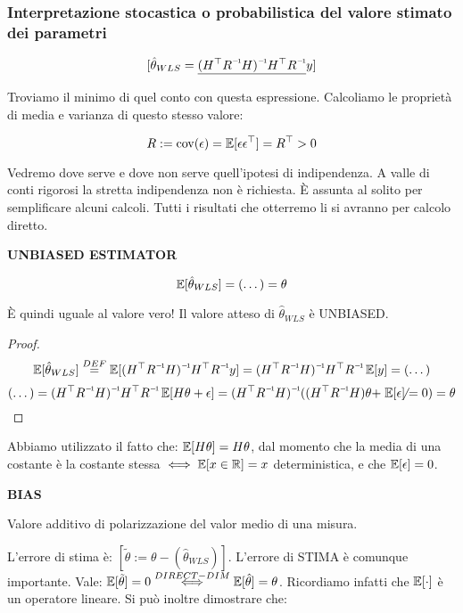 \subsubsection{Interpretazione stocastica o probabilistica del valore stimato dei parametri}

\[
	[\hat{\theta}_{WLS} = \underline{\inv{(H^\top\inv{R}H)}H^\top\inv{R}}y]
\]

Troviamo il minimo di quel conto con questa espressione. Calcoliamo le proprietà di media e varianza di questo stesso valore:

\[
	R := \operatorname{cov}(\epsilon) = \operatorname{\mathbb{E}}[\epsilon\epsilon^\top] = R^\top > 0
\]

Vedremo dove serve e dove non serve quell'ipotesi di indipendenza. A valle di conti rigorosi la stretta indipendenza non è richiesta. \`E assunta al solito per semplificare alcuni calcoli. Tutti i risultati che otterremo li si avranno per calcolo diretto.

\begin{thrm}{\textbf{UNBIASED ESTIMATOR}}

\[
	\operatorname{\mathbb{E}}[\hat{\theta}_{WLS}] = (\dots) = \theta
\]

\end{thrm}

\`E quindi uguale al valore vero! Il valore atteso di $\hat{\theta}_{WLS}$ è UNBIASED. 

\begin{proof}

\[
	\E[\hat{\theta}_{WLS}] \stackrel{DEF}{=} \E[\inv{(H^\top\inv{R}H)}H^\top\inv{R}y] = \inv{(H^\top\inv{R}H)}H^\top\inv{R}\E[y] = (\dots)
\]
\[
	(\dots) = \inv{(H^\top\inv{R}H)}H^\top\inv{R}\E[H\theta+\epsilon] = \inv{(H^\top\inv{R}H)}((H^\top\inv{R}H)\theta+\centernot{\E[\epsilon]=0}) = \theta
\]

\end{proof}

Abbiamo utilizzato il fatto che: $\operatorname{\mathbb{E}}[H\theta]=H\theta$, dal momento che la media di una costante è la costante stessa $\iff\operatorname{\mathbb{E}}[x\in\mathbb{R}]=x$ deterministica, e che $\operatorname{\mathbb{E}}[\epsilon]=0$.

\begin{defn}{\textbf{BIAS}}

Valore additivo di polarizzazione del valor medio di una misura.

\end{defn}

L'errore di stima è: $[\tilde{\theta} := \theta - (\hat{\theta}_{WLS})]$. L'errore di STIMA è comunque importante. Vale: $\operatorname{\mathbb{E}}[\tilde{\theta}]=0 \stackrel{DIRECT-DIM}{\iff} \operatorname{\mathbb{E}}[\hat{\theta}]=\theta$. Ricordiamo infatti che $\operatorname{\mathbb{E}}[\mathord{\cdot}]$ è un operatore lineare. Si può inoltre dimostrare che:

